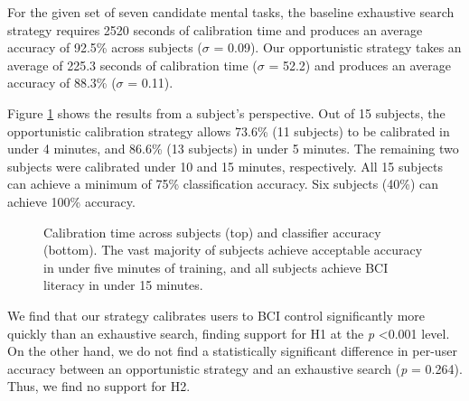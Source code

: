 
For the given set of seven candidate mental tasks, the baseline exhaustive search strategy requires 2520 seconds of calibration time and produces an average accuracy of 92.5\% across subjects (\textit{$\sigma$} = 0.09). Our opportunistic strategy takes an average of 225.3 seconds of calibration time (\textit{$\sigma$} = 52.2) and produces an average accuracy of 88.3\% (\textit{$\sigma$} = 0.11).

Figure \ref{fig:calibration_results} shows the results from a subject's perspective. Out of 15 subjects, the opportunistic calibration strategy allows 73.6\% (11 subjects) to be calibrated in under 4 minutes, and 86.6\% (13 subjects) in under 5 minutes. The remaining two subjects were calibrated under 10 and 15 minutes, respectively. All 15 subjects can achieve a minimum of 75\% classification accuracy. Six subjects (40\%) can achieve 100\% accuracy.

\begin{figure}[!h]
  \vspace{-0.2cm}
  \centering
   {}
  \caption{Calibration time across subjects (top) and classifier accuracy (bottom). The vast majority of subjects achieve acceptable accuracy in under five minutes of training, and all subjects achieve BCI literacy in under 15 minutes. }
  \label{fig:calibration_results}
  \vspace{-0.1cm}
\end{figure}

We find that our strategy calibrates users to BCI control significantly more quickly than an exhaustive search, finding support for H1 at the \textit{p} \textless 0.001 level. On the other hand, we do not find a statistically significant difference in per-user accuracy between an opportunistic strategy and an exhaustive search (\textit{p} = 0.264). Thus, we find no support for H2.

